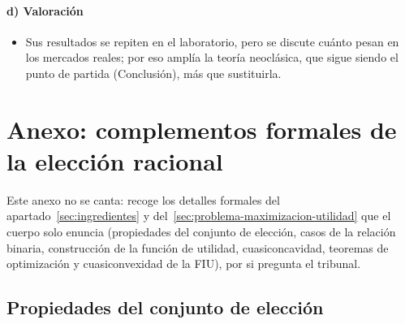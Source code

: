 \documentclass[11pt]{article}
\begin{document}
\paragraph{d) Valoración}

\begin{itemize}
\item Sus resultados se repiten en el laboratorio, pero se discute cuánto pesan en los mercados reales; por eso amplía la teoría neoclásica, que sigue siendo el punto de partida (Conclusión), más que sustituirla.
\end{itemize}

\section{Anexo: complementos formales de la elección racional}\label{anexo:formales}

\begin{notaopositor}
Este anexo no se canta: recoge los detalles formales del apartado~\ref{sec:ingredientes} y del~\ref{sec:problema-maximizacion-utilidad} que el cuerpo solo enuncia (propiedades del conjunto de elección, casos de la relación binaria, construcción de la función de utilidad, cuasiconcavidad, teoremas de optimización y cuasiconvexidad de la FIU), por si pregunta el tribunal.
\end{notaopositor}

\subsection{Propiedades del conjunto de elección}\label{anexo:conjunto-eleccion}
\end{document}

